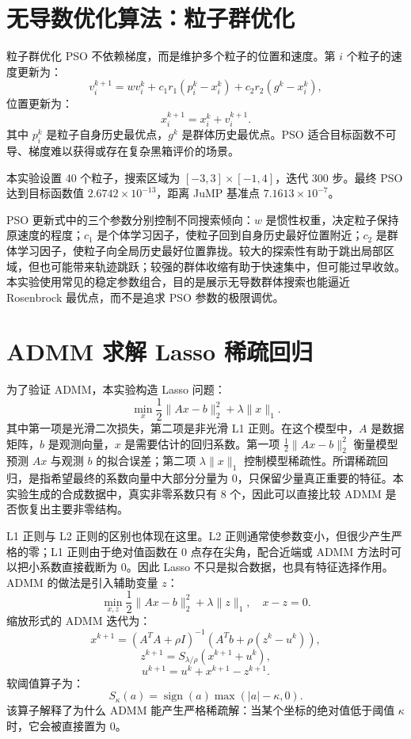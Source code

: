 \documentclass[UTF8,a4paper,12pt,fontset=none]{ctexart}
\begin{document}
\section{无导数优化算法：粒子群优化}

粒子群优化 PSO 不依赖梯度，而是维护多个粒子的位置和速度。第 $i$ 个粒子的速度更新为：
\[
v_i^{k+1}=wv_i^k+c_1r_1(p_i^k-x_i^k)+c_2r_2(g^k-x_i^k),
\]
位置更新为：
\[
x_i^{k+1}=x_i^k+v_i^{k+1}.
\]
其中 $p_i^k$ 是粒子自身历史最优点，$g^k$ 是群体历史最优点。PSO 适合目标函数不可导、梯度难以获得或存在复杂黑箱评价的场景。

本实验设置 40 个粒子，搜索区域为 $[-3,3]\times[-1,4]$，迭代 300 步。最终 PSO 达到目标函数值 $2.6742\times10^{-13}$，距离 JuMP 基准点 $7.1613\times10^{-7}$。

PSO 更新式中的三个参数分别控制不同搜索倾向：$w$ 是惯性权重，决定粒子保持原速度的程度；$c_1$ 是个体学习因子，使粒子回到自身历史最好位置附近；$c_2$ 是群体学习因子，使粒子向全局历史最好位置靠拢。较大的探索性有助于跳出局部区域，但也可能带来轨迹跳跃；较强的群体收缩有助于快速集中，但可能过早收敛。本实验使用常见的稳定参数组合，目的是展示无导数群体搜索也能逼近 Rosenbrock 最优点，而不是追求 PSO 参数的极限调优。

\section{ADMM 求解 Lasso 稀疏回归}

为了验证 ADMM，本实验构造 Lasso 问题：
\[
\min_x \frac12\|Ax-b\|_2^2+\lambda\|x\|_1.
\]
其中第一项是光滑二次损失，第二项是非光滑 L1 正则。在这个模型中，$A$ 是数据矩阵，$b$ 是观测向量，$x$ 是需要估计的回归系数。第一项 $\frac12\|Ax-b\|_2^2$ 衡量模型预测 $Ax$ 与观测 $b$ 的拟合误差；第二项 $\lambda\|x\|_1$ 控制模型稀疏性。所谓稀疏回归，是指希望最终的系数向量中大部分分量为 0，只保留少量真正重要的特征。本实验生成的合成数据中，真实非零系数只有 8 个，因此可以直接比较 ADMM 是否恢复出主要非零结构。

L1 正则与 L2 正则的区别也体现在这里。L2 正则通常使参数变小，但很少产生严格的零；L1 正则由于绝对值函数在 0 点存在尖角，配合近端或 ADMM 方法时可以把小系数直接截断为 0。因此 Lasso 不只是拟合数据，也具有特征选择作用。ADMM 的做法是引入辅助变量 $z$：
\[
\min_{x,z} \frac12\|Ax-b\|_2^2+\lambda\|z\|_1,\quad x-z=0.
\]
缩放形式的 ADMM 迭代为：
\[
x^{k+1}=(A^TA+\rho I)^{-1}(A^Tb+\rho(z^k-u^k)),
\]
\[
z^{k+1}=S_{\lambda/\rho}(x^{k+1}+u^k),
\]
\[
u^{k+1}=u^k+x^{k+1}-z^{k+1}.
\]
软阈值算子为：
\[
S_\kappa(a)=\operatorname{sign}(a)\max(|a|-\kappa,0).
\]
该算子解释了为什么 ADMM 能产生严格稀疏解：当某个坐标的绝对值低于阈值 $\kappa$ 时，它会被直接置为 0。
\end{document}
